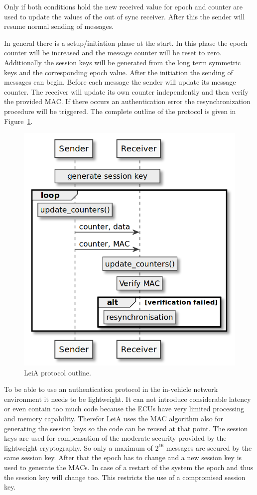 Only if both conditions hold the new received value for epoch and counter are
used to update the values of the out of sync receiver. After this the sender
will resume normal sending of messages. 

In general there is a setup/initiation phase at the start. In this phase the
epoch counter will be increased and the message counter will be reset to zero.
Additionally the session keys will be generated from the long term symmetric
keys and the corresponding epoch value. After the initiation the sending of
messages can begin. Before each message the sender will update its message
counter. The receiver will update its own counter independently and then verify
the provided MAC. If there occurs an authentication error the resynchronization
procedure will be triggered. The complete outline of the protocol is given in
Figure~\ref{fig:leia_outline}.

\begin{figure}[h]
    \centering
    \captionsetup{justification=centering}
	\includegraphics[width=0.9\linewidth]{Figures/LeiA_outline.png}
	\caption[]{LeiA protocol outline.}
	\label{fig:leia_outline}
\end{figure}

To be able to use an authentication protocol in the in-vehicle network
environment it needs to be lightweight. It can not introduce considerable
latency or even contain too much code because the ECUs have very limited
processing and memory capability. Therefor LeiA uses the MAC algorithm also for
generating the session keys so the code can be reused at that point. The session
keys are used for compensation of the moderate security provided by the
lightweight cryptography. So only a maximum of \( 2^16 \) messages are secured
by the same session key. After that the epoch has to change and a new session
key is used to generate the MACs. In case of a restart of the system the epoch
and thus the session key will change too. This restricts the use of a
compromised session key.

